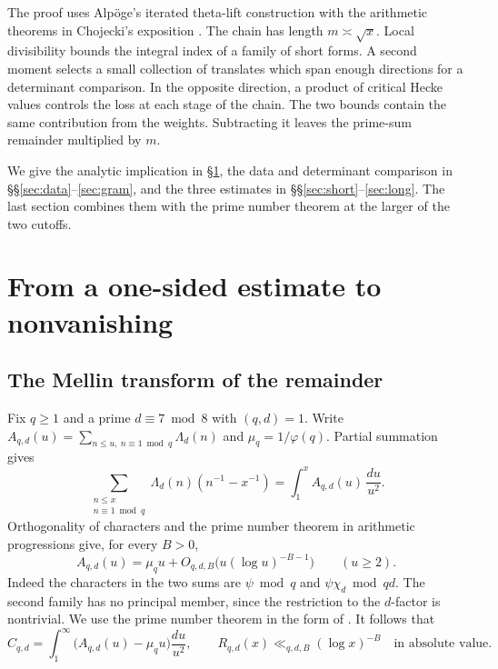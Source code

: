 \documentclass[11pt,reqno]{amsart}
\theoremstyle{definition}
\numberwithin{equation}{section}
\begin{document}
The proof uses Alp\"oge's iterated theta-lift construction
\cite{alpoge} with the arithmetic theorems in Chojecki's
exposition \cite{chojecki}. The chain has length \(m\asymp\sqrt{x}\).
Local divisibility bounds the integral index of a family of short
forms. A second moment selects a small collection of translates
which span enough directions for a determinant comparison.
In the opposite direction, a product of critical Hecke values
controls the loss at each stage of the chain. The two bounds contain
the same contribution from the weights. Subtracting it leaves the
prime-sum remainder multiplied by \(m\).

We give the analytic implication in \S\ref{sec:analytic}, the data
and determinant comparison in \S\S\ref{sec:data}--\ref{sec:gram},
and the three estimates in \S\S\ref{sec:short}--\ref{sec:long}.
The last section combines them with the prime number theorem at the
larger of the two cutoffs.


\section{From a one-sided estimate to nonvanishing}\label{sec:analytic}

\subsection{The Mellin transform of the remainder}

Fix \(q\ge1\) and a prime \(d\equiv7\bmod 8\) with \((q,d)=1\).
Write \(A_{q,d}(u)=\sum_{n\le u,\ n\equiv1\bmod q}\Lambda_d(n)\) and
\(\mu_q=1/\varphi(q)\). Partial summation gives
\begin{equation}\label{eq:partial}
 \sum_{\substack{n\le x\\ n\equiv1\bmod q}}\Lambda_d(n)
       (n^{-1}-x^{-1})
 = \int_1^x A_{q,d}(u)\,\frac{du}{u^2}.
\end{equation}
Orthogonality of characters and the prime number theorem in arithmetic
progressions give, for every \(B>0\),
\[
 A_{q,d}(u)=\mu_q u+O_{q,d,B}\bigl(u(\log u)^{-B-1}\bigr)\qquad(u\ge2).
\]
Indeed the characters in the two sums are \(\psi\bmod q\) and
\(\psi\chi_d\bmod qd\). The second family has no principal member, since
the restriction to the \(d\)-factor is nontrivial. We use the prime number
theorem in the form of \cite[Ch.~11]{mv}. It follows that
\begin{equation}\label{eq:pnt-tail}
 C_{q,d}=\int_1^\infty\bigl(A_{q,d}(u)-\mu_q u\bigr)\frac{du}{u^2},
 \qquad R_{q,d}(x)\ll_{q,d,B}(\log x)^{-B}\quad\text{in absolute value}.
\end{equation}
\end{document}
